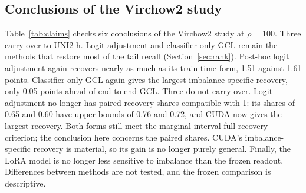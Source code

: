 \subsection{Conclusions of the Virchow2 study}
Table~\ref{tab:claims} checks six conclusions of the Virchow2 study at $\rho=100$. Three carry over to UNI2-h. Logit adjustment and classifier-only GCL remain the methods that restore most of the tail recall (Section~\ref{sec:rank}). Post-hoc logit adjustment again recovers nearly as much as its train-time form, 1.51 against 1.61 points. Classifier-only GCL again gives the largest imbalance-specific recovery, only 0.05 points ahead of end-to-end GCL. Three do not carry over. Logit adjustment no longer has paired recovery shares compatible with 1: its shares of 0.65 and 0.60 have upper bounds of 0.76 and 0.72, and CUDA now gives the largest recovery. Both forms still meet the marginal-interval full-recovery criterion; the conclusion here concerns the paired shares. CUDA's imbalance-specific recovery is material, so its gain is no longer purely general. Finally, the LoRA model is no longer less sensitive to imbalance than the frozen readout. Differences between methods are not tested, and the frozen comparison is descriptive.

